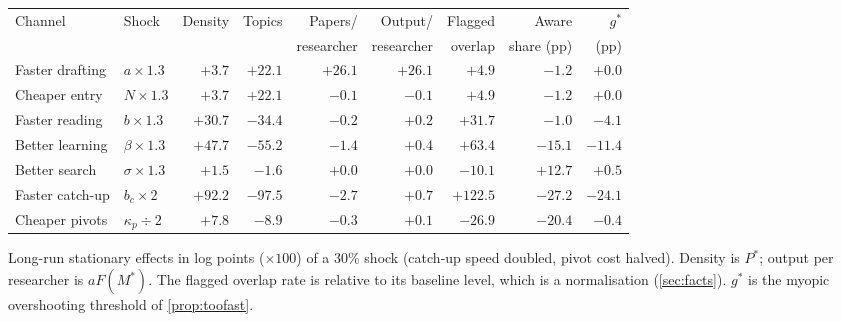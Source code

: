 \small
\begin{tabular}{@{}llrrrrrrr@{}}
\toprule
Channel & Shock & Density & Topics & Papers/ & Output/ & Flagged & Aware & $g^*$ \\
 & & & & researcher & researcher & overlap & share (pp) & (pp) \\
\midrule
Faster drafting & $a\times1.3$ & $+3.7$ & $+22.1$ & $+26.1$ & $+26.1$ & $+4.9$ & $-1.2$ & $+0.0$ \\
Cheaper entry & $N\times1.3$ & $+3.7$ & $+22.1$ & $-0.1$ & $-0.1$ & $+4.9$ & $-1.2$ & $+0.0$ \\
Faster reading & $b\times1.3$ & $+30.7$ & $-34.4$ & $-0.2$ & $+0.2$ & $+31.7$ & $-1.0$ & $-4.1$ \\
Better learning & $\beta\times1.3$ & $+47.7$ & $-55.2$ & $-1.4$ & $+0.4$ & $+63.4$ & $-15.1$ & $-11.4$ \\
Better search & $\sigma\times1.3$ & $+1.5$ & $-1.6$ & $+0.0$ & $+0.0$ & $-10.1$ & $+12.7$ & $+0.5$ \\
Faster catch-up & $b_c\times 2$ & $+92.2$ & $-97.5$ & $-2.7$ & $+0.7$ & $+122.5$ & $-27.2$ & $-24.1$ \\
Cheaper pivots & $\kappa_p\div 2$ & $+7.8$ & $-8.9$ & $-0.3$ & $+0.1$ & $-26.9$ & $-20.4$ & $-0.4$ \\
\bottomrule
\end{tabular}
\par\smallskip\footnotesize Long-run stationary effects in log points ($\times100$) of a 30\% shock (catch-up speed doubled, pivot cost halved). Density is $P^*$; output per researcher is $aF(M^*)$. The flagged overlap rate is relative to its baseline level, which is a normalisation (\cref{sec:facts}). $g^*$ is the myopic overshooting threshold of \cref{prop:toofast}.
